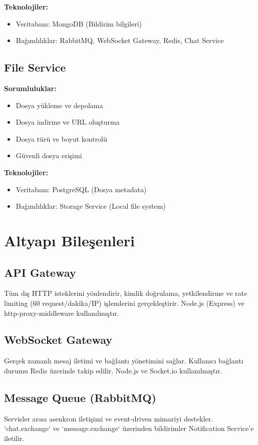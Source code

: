 \textbf{Teknolojiler:}
\begin{itemize}
    \item Veritabanı: MongoDB (Bildirim bilgileri)
    \item Bağımlılıklar: RabbitMQ, WebSocket Gateway, Redis, Chat Service
\end{itemize}

\subsection{File Service}
\textbf{Sorumluluklar:}
\begin{itemize}
    \item Dosya yükleme ve depolama
    \item Dosya indirme ve URL oluşturma
    \item Dosya türü ve boyut kontrolü
    \item Güvenli dosya erişimi
\end{itemize}

\textbf{Teknolojiler:}
\begin{itemize}
    \item Veritabanı: PostgreSQL (Dosya metadata)
    \item Bağımlılıklar: Storage Service (Local file system)
\end{itemize}

\section{Altyapı Bileşenleri}

\subsection{API Gateway}
Tüm dış HTTP isteklerini yönlendirir, kimlik doğrulama, yetkilendirme ve rate limiting (60 request/dakika/IP) işlemlerini gerçekleştirir. Node.js (Express) ve http-proxy-middleware kullanılmıştır.

\subsection{WebSocket Gateway}
Gerçek zamanlı mesaj iletimi ve bağlantı yönetimini sağlar. Kullanıcı bağlantı durumu Redis üzerinde takip edilir. Node.js ve Socket.io kullanılmıştır.

\subsection{Message Queue (RabbitMQ)}
Servisler arası asenkron iletişimi ve event-driven mimariyi destekler. `chat.exchange` ve `message.exchange` üzerinden bildirimler Notification Service'e iletilir.

